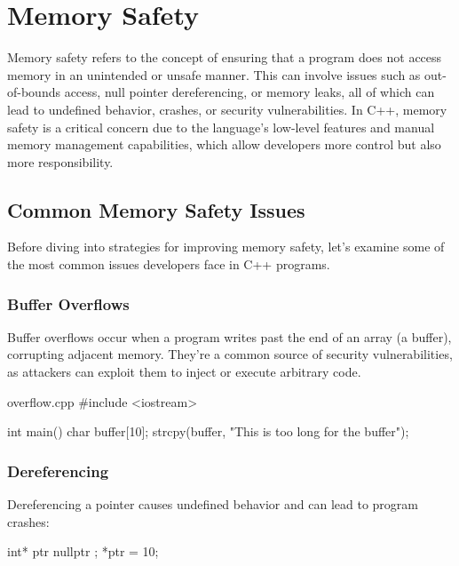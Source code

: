 \documentclass[12pt]{article}
\begin{document}
\tableofcontents

\pagebreak

\section{Memory Safety}

\noindent
Memory safety refers to the concept of ensuring that a program does not access memory in an unintended or unsafe manner.
This can involve issues such as out-of-bounds access, null pointer dereferencing, or memory leaks, all of which can lead to undefined behavior, crashes, or security vulnerabilities.
In C++, memory safety is a critical concern due to the language's low-level features and manual memory management capabilities, which allow developers more control but also more responsibility.

\subsection{Common Memory Safety Issues}

\noindent
Before diving into strategies for improving memory safety, let's examine some of the most common issues developers face in C++ programs.

\subsubsection{Buffer Overflows}

\noindent
Buffer overflows occur when a program writes past the end of an array (a buffer), corrupting adjacent memory.
They’re a common source of security vulnerabilities, as attackers can exploit them to inject or execute arbitrary code.

\begin{cxx}{overflow.cpp}
#include <iostream>

int main()
{
    char buffer[10];
    strcpy(buffer, "This is too long for the buffer");
}
\end{cxx}

\subsubsection{ Dereferencing}

\noindent
Dereferencing a  pointer causes undefined behavior and can lead to program crashes:

\begin{cxx}{}
int* ptr { nullptr };
*ptr = 10;
\end{cxx}
\end{document}
